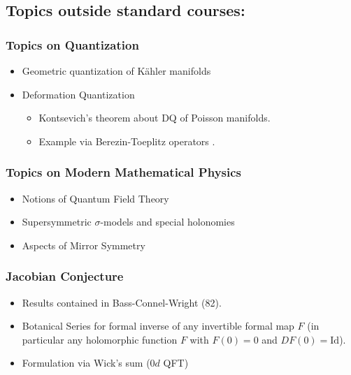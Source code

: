 \documentclass{article}
\begin{document}
\subsection*{Topics outside standard courses:}
\subsubsection*{Topics on Quantization}
\begin{itemize}
    \item Geometric quantization of Kähler manifolds \cite{Schlichenmaier_2010, Ma_2008, Chan_2021}
    \item Deformation Quantization
    \begin{itemize}
        \item Kontsevich's theorem about DQ of Poisson manifolds. \cite{Kontsevich_2003}
        \item Example via Berezin-Toeplitz operators \cite{schlichenmaier1999deformationquantizationcompactkaehler}.
\end{itemize}
\end{itemize}
\subsubsection*{Topics on Modern Mathematical Physics \cite{QFT-Strings,Mirror}}
\begin{itemize}
    \item Notions of Quantum Field Theory
    \item Supersymmetric $\sigma$-models and special holonomies
    \item Aspects of Mirror Symmetry
\end{itemize}
\clearpage


\subsubsection*{Jacobian Conjecture \cite{BCW}}
\begin{itemize}
    \item Results contained in Bass-Connel-Wright (82). %
    \item Botanical Series for formal inverse of any invertible formal map $F$ (in particular any holomorphic function $F$ with $F(0)=0$ and $DF(0)=\mathrm{Id}$).
    \item Formulation via Wick's sum ($0d$ QFT) \cite{Abdesselam}
\end{itemize}
\end{document}
